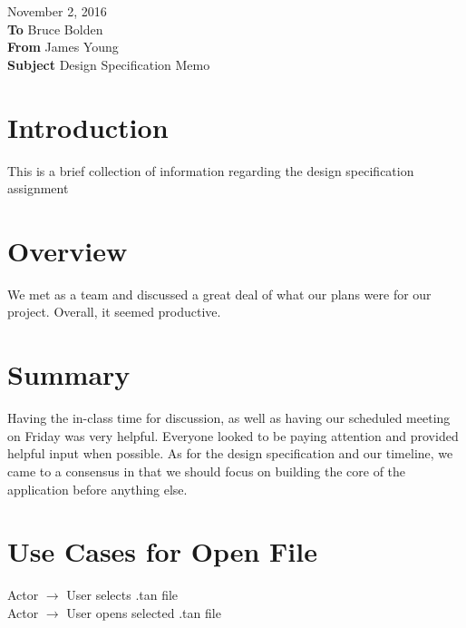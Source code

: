 \documentclass[12pt]{article}
\begin{document}
	\hfill November 2, 2016\\
	\noindent \textbf{To}		Bruce Bolden\\
	\textbf{From}	James Young\\
	\textbf{Subject}	Design Specification Memo\\

	\section*{Introduction}
		This is a brief collection of information regarding the design specification assignment
	\section*{Overview}
		We met as a team and discussed a great deal of what our plans were for
		our project. Overall, it seemed productive.
	\section*{Summary}
		Having the in-class time for discussion, as well as having our scheduled meeting
		on Friday was very helpful. Everyone looked to be paying attention and provided
		helpful input when possible. As for the design specification and our timeline, we came
		to a consensus in that we should focus on building the core of the application before
		anything else.
		

	\clearpage

	\section*{Use Cases for Open File}
		Actor $\longrightarrow$ User selects .tan file\\
		Actor $\longrightarrow$ User opens selected .tan file\\
	
\end{document}
